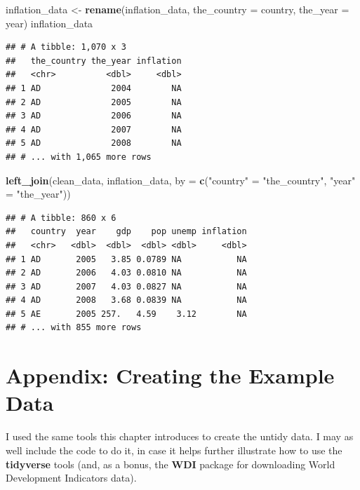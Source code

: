 \documentclass[12pt,oneside,openany]{book}
\newenvironment{Shaded}{\begin{snugshade}}{\end{snugshade}}
\newcommand{\KeywordTok}[1]{\textcolor[rgb]{0.13,0.29,0.53}{\textbf{#1}}}
\newcommand{\DataTypeTok}[1]{\textcolor[rgb]{0.13,0.29,0.53}{#1}}
\newcommand{\StringTok}[1]{\textcolor[rgb]{0.31,0.60,0.02}{#1}}
\newcommand{\NormalTok}[1]{#1}
\begin{document}
\begin{Shaded}
\begin{Highlighting}[]
\NormalTok{inflation_data <-}\StringTok{ }\KeywordTok{rename}\NormalTok{(inflation_data,}
                         \DataTypeTok{the_country =}\NormalTok{ country,}
                         \DataTypeTok{the_year =}\NormalTok{ year)}
\NormalTok{inflation_data}
\end{Highlighting}
\end{Shaded}

\begin{verbatim}
## # A tibble: 1,070 x 3
##   the_country the_year inflation
##   <chr>          <dbl>     <dbl>
## 1 AD              2004        NA
## 2 AD              2005        NA
## 3 AD              2006        NA
## 4 AD              2007        NA
## 5 AD              2008        NA
## # ... with 1,065 more rows
\end{verbatim}

\begin{Shaded}
\begin{Highlighting}[]
\KeywordTok{left_join}\NormalTok{(clean_data,}
\NormalTok{          inflation_data,}
          \DataTypeTok{by =} \KeywordTok{c}\NormalTok{(}\StringTok{"country"}\NormalTok{ =}\StringTok{ "the_country"}\NormalTok{, }\StringTok{"year"}\NormalTok{ =}\StringTok{ "the_year"}\NormalTok{))}
\end{Highlighting}
\end{Shaded}

\begin{verbatim}
## # A tibble: 860 x 6
##   country  year    gdp    pop unemp inflation
##   <chr>   <dbl>  <dbl>  <dbl> <dbl>     <dbl>
## 1 AD       2005   3.85 0.0789 NA           NA
## 2 AD       2006   4.03 0.0810 NA           NA
## 3 AD       2007   4.03 0.0827 NA           NA
## 4 AD       2008   3.68 0.0839 NA           NA
## 5 AE       2005 257.   4.59    3.12        NA
## # ... with 855 more rows
\end{verbatim}

\section{Appendix: Creating the Example
Data}\label{appendix-creating-the-example-data}

I used the same tools this chapter introduces to create the untidy data.
I may as well include the code to do it, in case it helps further
illustrate how to use the \textbf{tidyverse} tools (and, as a bonus, the
\textbf{WDI} package for downloading World Development Indicators data).
\end{document}

